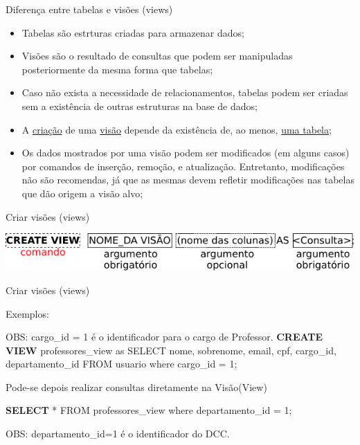 \documentclass[xcolor=x11names,compress]{beamer}
\begin{document}
\begin{frame}[allowframebreaks]{Diferença entre tabelas e visões (views)}

\begin{itemize}
\itemsep 5mm

\item Tabelas são estrturas criadas para armazenar dados;

\item Visões são o resultado de consultas que podem ser manipuladas posteriormente da mesma forma que tabelas;

\item Caso não exista a necessidade de relacionamentos, tabelas podem ser criadas sem a existência de outras estruturas na base de dados;

\item A \underline{criação} de uma \underline{visão} depende da existência de, ao menos, \underline{uma tabela};

\item Os dados mostrados por uma visão podem ser modificados (em alguns casos) por comandos de inserção, remoção, e atualização. Entretanto, modificações não são recomendas, já que as mesmas devem refletir modificações nas tabelas que dão origem a  visão alvo;
\end{itemize}

\end{frame}

\begin{frame}{Criar visões (views)}

\centering \includegraphics[keepaspectratio,width=\textwidth]{create_view}

\end{frame}

\begin{frame}{Criar visões (views)}

Exemplos:

\begin{alertblock}{OBS: cargo\_id = 1 é o identificador para o cargo de Professor.}
\textbf{CREATE VIEW} professores\_view as SELECT nome, sobrenome, email, cpf, cargo\_id, departamento\_id FROM usuario where cargo\_id = 1;
\end{alertblock}


\pause

\begin{alertblock}{Pode-se depois realizar consultas diretamente na Visão(View)}

\textbf{SELECT} * FROM professores\_view where departamento\_id = 1;

\end{alertblock}

\begin{alertblock}{OBS: departamento\_id=1 é o identificador do DCC.}
\end{alertblock}

\end{frame}
\end{document}
